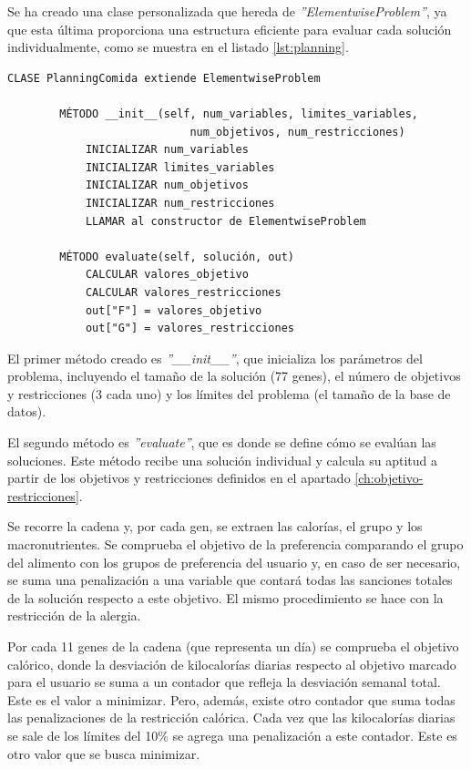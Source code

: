 Se ha creado una clase personalizada que hereda de \textit{''ElementwiseProblem''}, ya que esta última proporciona una estructura eficiente para evaluar cada solución individualmente, como se muestra en el listado \ref{lst:planning}.
\newpage
\begin{lstlisting}[basicstyle=\ttfamily, caption=Clase para la evaluación.,label={lst:planning}]
    CLASE PlanningComida extiende ElementwiseProblem
    
        MÉTODO __init__(self, num_variables, limites_variables,
                            num_objetivos, num_restricciones)
            INICIALIZAR num_variables
            INICIALIZAR limites_variables
            INICIALIZAR num_objetivos
            INICIALIZAR num_restricciones
            LLAMAR al constructor de ElementwiseProblem
    
        MÉTODO evaluate(self, solución, out)
            CALCULAR valores_objetivo
            CALCULAR valores_restricciones
            out["F"] = valores_objetivo
            out["G"] = valores_restricciones
\end{lstlisting}

El primer método creado es \textit{''\_\_init\_\_''}, que inicializa los parámetros del problema, incluyendo el tamaño de la solución (77 genes), el número de objetivos y restricciones (3 cada uno) y los límites del problema (el tamaño de la base de datos).

El segundo método es \textit{''evaluate''}, que es donde se define cómo se evalúan las soluciones. Este método recibe una solución individual y calcula su aptitud a partir de los objetivos y restricciones definidos en el apartado \ref{ch:objetivo-restricciones}.

Se recorre la cadena y, por cada gen, se extraen las calorías, el grupo y los macronutrientes. Se comprueba el objetivo de la preferencia comparando el grupo del alimento con los grupos de preferencia del usuario y, en caso de ser necesario, se suma una penalización a una variable que contará todas las sanciones totales de la solución respecto a este objetivo. El mismo procedimiento se hace con la restricción de la alergia.

Por cada 11 genes de la cadena (que representa un día) se comprueba el objetivo calórico, donde la desviación de kilocalorías diarias respecto al objetivo marcado para el usuario se suma a un contador que refleja la desviación semanal total. Este es el valor a minimizar. Pero, además, existe otro contador que suma todas las penalizaciones de la restricción calórica. Cada vez que las kilocalorías diarias se sale de los límites del 10\% se agrega una penalización a este contador. Este es otro valor que se busca minimizar.

